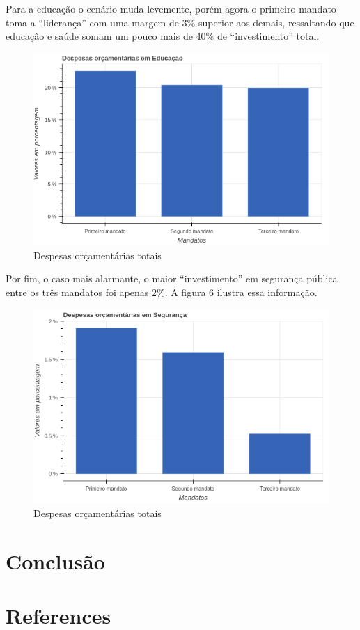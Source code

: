 \documentclass[authoryear]{elsarticle}
\begin{document}
Para a educação o cenário muda levemente, porém agora o primeiro mandato toma a “liderança” com uma margem de 3\% superior aos demais, ressaltando que educação e saúde somam um pouco mais de 40\% de “investimento” total.


\graphicspath{{figuras/}}
\begin{figure}[H]
\centering
\includegraphics[scale=0.5]{figura_8.png}
\caption{Despesas orçamentárias totais}
\label{Rotulo}
\end{figure}

Por fim, o caso mais alarmante, o maior “investimento” em segurança pública entre os três mandatos foi apenas 2\%. A figura 6 ilustra essa informação.

\graphicspath{{figuras/}}
\begin{figure}[H]
\centering
\includegraphics[scale=0.5]{figura_10.png}
\caption{Despesas orçamentárias totais}
\label{Rotulo}
\end{figure}

\section{Conclusão}

\section*{References}


\end{document}
